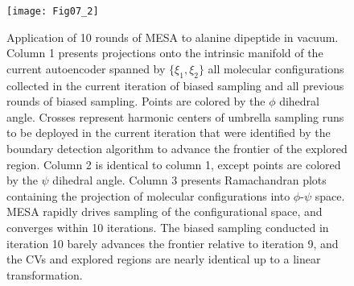 \documentclass[12pt]{article}
\begin{document}
\clearpage
\newpage

\begin{figure}[ht!]
\begin{center}
\texttt{[image: Fig07\_2]} 
\end{center}
\end{figure}

\clearpage
\newpage

\begin{figure}[ht!]
\caption{Application of 10 rounds of MESA to alanine dipeptide in vacuum. Column 1 presents projections onto the intrinsic manifold of the current autoencoder spanned by $\{\xi_1,\xi_2\}$ all molecular configurations collected in the current iteration of biased sampling and all previous rounds of biased sampling. Points are colored by the $\phi$ dihedral angle. Crosses represent harmonic centers of umbrella sampling runs to be deployed in the current iteration that were identified by the boundary detection algorithm to advance the frontier of the explored region. Column 2 is identical to column 1, except points are colored by the $\psi$ dihedral angle. Column 3 presents Ramachandran plots containing the projection of molecular configurations into $\phi$-$\psi$ space. MESA rapidly drives sampling of the configurational space, and converges within 10 iterations. The biased sampling conducted in iteration 10 barely advances the frontier relative to iteration 9, and the CVs and explored regions are nearly identical up to a linear transformation.} \label{alanine_series}
\end{figure}
\end{document}
